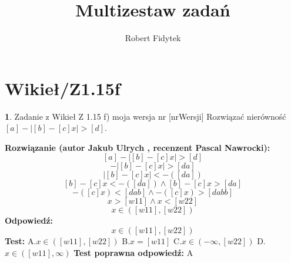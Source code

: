 \documentclass[12pt, a4paper]{article}
\title{Multizestaw zadań}
\author{Robert Fidytek}
\date{}
\theoremstyle{definition} %
\newtheorem{zad}{}
\newcommand{\kategoria}[1]{\section{#1}} %
\newcommand{\zadStart}[1]{\begin{zad}#1\newline} %
\newcommand{\zadStop}{\end{zad}}   %
\newcommand{\rozwStart}[2]{\noindent \textbf{Rozwiązanie (autor #1 , recenzent #2): }\newline} %
\newcommand{\rozwStop}{\newline}                                            %
\newcommand{\odpStart}{\noindent \textbf{Odpowiedź:}\newline}    %
\newcommand{\odpStop}{\newline}                                             %
\newcommand{\testStart}{\noindent \textbf{Test:}\newline} %
\newcommand{\testStop}{\newline} %
\newcommand{\kluczStart}{\noindent \textbf{Test poprawna odpowiedź:}\newline} %
\newcommand{\kluczStop}{\newline} %
\begin{document}
\maketitle


\kategoria{Wikieł/Z1.15f}
\zadStart{Zadanie z Wikieł Z 1.15 f) moja wersja nr [nrWersji]}
Rozwiązać nierówność $[a]-|[b]-[c]x|>[d]$.
\zadStop
\rozwStart{Jakub Ulrych}{Pascal Nawrocki}
$$[a]-|[b]-[c]x|>[d]$$ 
$$-|[b]-[c]x|>[da]$$
$$|[b]-[c]x|<-([da])$$
$$[b]-[c]x< -([da]) \land [b]-[c]x>[da]$$
$$-([c]x)< [dab] \land -([c]x)> [dabb]$$
$$x> [w11] \land x< [w22]$$
$$x\in([w11],[w22])$$
\rozwStop
\odpStart
$$x\in([w11],[w22])$$
\odpStop
\testStart
A.$x\in([w11],[w22])$
B.$x=[w11]$
C.$x\in(-\infty,[w22])$
D.$x\in([w11],\infty)$
\testStop
\kluczStart
A
\kluczStop
\end{document}
